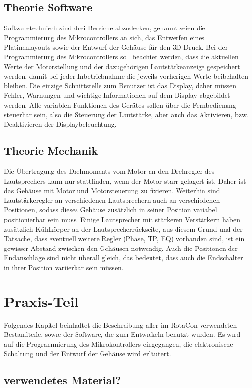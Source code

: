 \documentclass[11pt, titlepage, fleqn]{report}
\begin{document}
		\section{Theorie Software}
		\label{sec:Theorie Software}
			Softwaretechnisch sind drei Bereiche abzudecken, genannt seien die Programmierung des Mikrocontrollers an sich, das Entwerfen eines Platinenlayouts sowie der Entwurf der Gehäuse für den 3D-Druck. Bei der Programmierung des Mikrocontrollers soll beachtet werden, dass die aktuellen Werte der Motorstellung und der dazugehörigen Lautstärkeanzeige gespeichert werden, damit bei jeder Inbetriebnahme die jeweils vorherigen Werte beibehalten bleiben. Die einzige Schnittstelle zum Benutzer ist das Display, daher müssen Fehler, Warnungen und wichtige Informationen auf dem Display abgebildet werden. Alle variablen Funktionen des Gerätes sollen über die Fernbedienung steuerbar sein, also die Steuerung der Lautstärke, aber auch das Aktivieren, bzw. Deaktivieren der Displaybeleuchtung.
		\section{Theorie Mechanik}
			Die Übertragung des Drehmoments vom Motor an den Drehregler des Lautsprechers kann nur stattfinden, wenn der Motor starr gelagert ist. Daher ist das Gehäuse mit Motor und Motorsteuerung zu fixieren. Weiterhin sind Lautstärkeregler an verschiedenen Lautsprechern auch an verschiedenen Positionen, sodass dieses Gehäuse zusätzlich in seiner Position variabel positionierbar sein muss. Einige Lautsprecher mit stärkeren Verstärkern haben zusätzlich Kühlkörper an der Lautsprecherrückseite, aus diesem Grund und der Tatsache, dass eventuell weitere Regler (Phase, TP, EQ) vorhanden sind, ist ein gewisser Abstand zwischen den Gehäusen notwendig. Auch die Positionen der Endanschläge sind nicht überall gleich, das bedeutet, dass auch die Endschalter in ihrer Position variierbar sein müssen.
		\label{sec:Theorie Mecanik}
	\chapter{Praxis-Teil}
	\label{sec:Praxistil}
		Folgendes Kapitel beinhaltet die Beschreibung aller im RotaCon verwendeten Bestandteile, sowie der Software, die zum Entwickeln benutzt wurden.
		Es wird auf die Programmierung des Mikrokontrollers eingegangen, die elektronische Schaltung und der Entwurf der Gehäuse wird erläutert.
		\section{verwendetes Material?}
\end{document}
